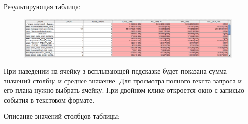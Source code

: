 Результирующая таблица:
\begin{figure}[H]
	\centering
	\includegraphics[width = 1\linewidth]{img/trace_analysis_result.png}
\end{figure}

При наведении на ячейку в всплывающей подсказке будет показана сумма значений столбца и среднее значение. Для просмотра полного текста запроса и его плана нужно выбрать ячейку. При двойном клике откроется окно с записью события в текстовом формате.

Описание значений столбцов таблицы:


